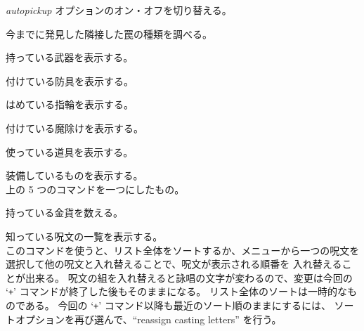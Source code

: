 \item[\tb{@}]
{\it autopickup\/} オプションのオン・オフを切り替える。
\item[\tb{\^{}}]
今までに発見した隣接した罠の種類を調べる。
\item[\tb{)}]
持っている武器を表示する。
\item[\tb{[}]
付けている防具を表示する。
\item[\tb{=}]
はめている指輪を表示する。
\item[\tb{"}]
付けている魔除けを表示する。
\item[\tb{(}]
使っている道具を表示する。
\item[\tb{*}]
装備しているものを表示する。\\
上の 5 つのコマンドを一つにしたもの。
\item[\tb{\$}]
持っている金貨を数える。
\item[\tb{+}]
知っている呪文の一覧を表示する。\\
このコマンドを使うと、リスト全体をソートするか、メニューから一つの呪文を
選択して他の呪文と入れ替えることで、呪文が表示される順番を
入れ替えることが出来る。
呪文の組を入れ替えると詠唱の文字が変わるので、変更は今回の
`{\tt +}' コマンドが終了した後もそのままになる。
リスト全体のソートは一時的なものである。
今回の `{\tt +}' コマンド以降も最近のソート順のままにするには、
ソートオプションを再び選んで、``reassign casting letters'' を行う。
